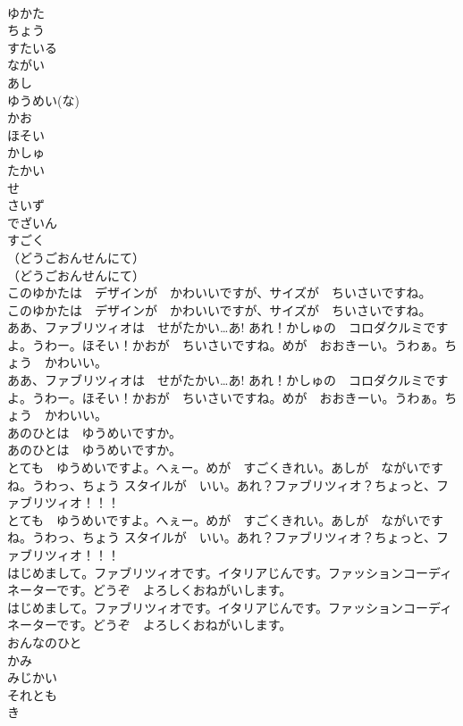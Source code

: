 \documentclass[8pt]{extreport}
\begin{document}
\begin{CJK}{UTF8}{min}
\\	ゆかた
\\	ちょう
\\	すたいる
\\	ながい
\\	あし
\\	ゆうめい(な)
\\	かお
\\	ほそい
\\	かしゅ
\\	たかい
\\	せ
\\	さいず
\\	でざいん
\\	すごく
\\	（どうごおんせんにて）	
\\	（どうごおんせんにて） 
\\	このゆかたは　デザインが　かわいいですが、サイズが　ちいさいですね。	
\\	このゆかたは　デザインが　かわいいですが、サイズが　ちいさいですね。 
\\	ああ、ファブリツィオは　せがたかい…あ! あれ！かしゅの　コロダクルミですよ。うわー。ほそい！かおが　ちいさいですね。めが　おおきーい。うわぁ。ちょう　かわいい。	
\\	ああ、ファブリツィオは　せがたかい…あ! あれ！かしゅの　コロダクルミですよ。うわー。ほそい！かおが　ちいさいですね。めが　おおきーい。うわぁ。ちょう　かわいい。 
\\	あのひとは　ゆうめいですか。	
\\	あのひとは　ゆうめいですか。 
\\	とても　ゆうめいですよ。へぇー。めが　すごくきれい。あしが　ながいですね。うわっ、ちょう スタイルが　いい。あれ？ファブリツィオ？ちょっと、ファブリツィオ！！！	
\\	とても　ゆうめいですよ。へぇー。めが　すごくきれい。あしが　ながいですね。うわっ、ちょう スタイルが　いい。あれ？ファブリツィオ？ちょっと、ファブリツィオ！！！ 
\\	はじめまして。ファブリツィオです。イタリアじんです。ファッションコーディネーターです。どうぞ　よろしくおねがいします。	
\\	はじめまして。ファブリツィオです。イタリアじんです。ファッションコーディネーターです。どうぞ　よろしくおねがいします。 
\\	おんなのひと
\\	かみ
\\	みじかい
\\	それとも
\\	き

\end{CJK}
\end{document}
